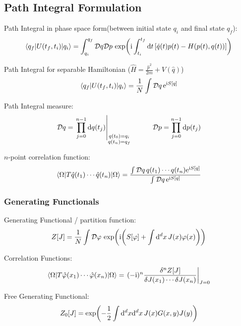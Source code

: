 	\subsection{Path Integral Formulation}
		Path Integral in phase space form(between initial state $q_i$ and final state $q_f$):
		\begin{equation}
			\mel**{q_f}{U(t_f, t_i)}{q_i} = \int_{q_i}^{q_f} \mathcal{D}q \mathcal{D}p \, \exp(\mathrm{i} \int_{t_i}^{t_f} \dd t \, \qty[ \dot{q}(t)p(t) - H\qty(p(t),q(t))])
		\end{equation}

		\noindent
		Path Integral for separable Hamiltonian (\ie $\hat{H} = \frac{\hat{p}^2}{2m} + V(\hat{q})$)
		\begin{equation}
			\mel**{q_f}{U(t_f, t_i)}{q_i} = \frac{1}{N} \int \mathcal{D}q \, \mathrm{e}^{\mathrm{i} S[q]}
		\end{equation}

		\noindent
		Path Integral measure:
		\begin{equation}
			\mathcal{D}q = \eval{\prod_{j=0}^{n-1} \dd q(t_j)}_{\substack{q(t_0)=q_i\\q(t_n)=q_f}}
			\hsp
			\mathcal{D}p = \prod_{j=0}^{n-1} \dd p(t_j)
		\end{equation}

		\noindent
		$n$-point correlation function:
		\begin{equation}
			\mel**{\Omega}{T\hat{q}(t_1)\dotsb\hat{q}(t_n)}{\Omega} = \frac{\int\mathcal{D}q\,q(t_1)\dotsb q(t_n)\mathrm{e}^{\mathrm{i} S \qty[q]}}{\int\mathcal{D}q\,\mathrm{e}^{\mathrm{i} S\qty[q]}}
		\end{equation}

		\subsubsection{Generating Functionals}
			Generating Functional / partition function:
			\begin{equation}
				Z[J] = \frac{1}{N} \int \mathcal{D}\varphi\, \exp(\mathrm{i}\qty(S[\varphi] + \int \dd^d x \, J(x) \varphi(x)))
			\end{equation}

			\noindent
			Correlation Functions:
			\begin{equation}
				\mel**{\Omega}{T \hat{\varphi}(x_1) \dotsb \hat{\varphi}(x_n)}{\Omega} = \eval{(-\i)^{n} \frac{\delta^n Z[J]}{\delta J(x_1) \dotsb \delta J(x_n)}}_{J=0}
			\end{equation}

			\noindent
			Free Generating Functional:
			\begin{equation}
				Z_0\qty[J] = \exp(-\frac{1}{2}\int\dd^d x \dd^d x\, J(x) G(x,y)J(y))
			\end{equation}

